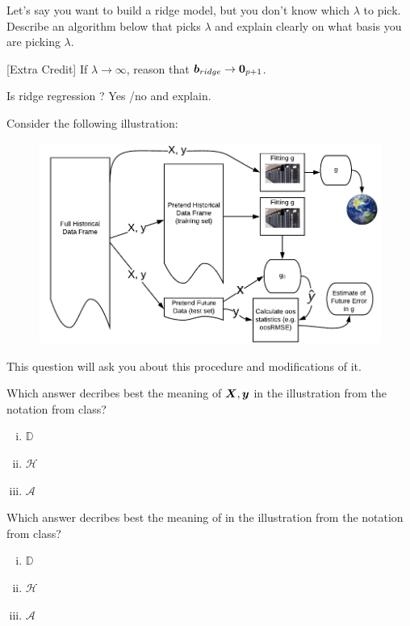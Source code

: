\documentclass[12pt]{article}
\begin{document}
 Let's say you want to build a ridge model, but you don't know which $\lambda$ to pick. Describe an algorithm below that picks $\lambda$ and explain clearly on what basis you are picking $\lambda$. 

 [Extra Credit] If $\lambda \rightarrow \infty$, reason that $\boldsymbol{b}_{ridge} \rightarrow \boldsymbol{0}_{p+1}$. 


 Is ridge regression ? Yes /no and explain. 
\eenum


\problem Consider the following illustration:

\begin{figure}[htp]
\centering\includegraphics[width=7in]{oos_validation}
\end{figure}

\noindent This question will ask you about this procedure and modifications of it.


\benum

 Which answer decribes best the meaning of $\boldsymbol{X}, \boldsymbol{y}$ in the illustration from the notation from class?

\begin{enumerate}[i)]
\item $\mathbb{D}$
\item $\mathcal{H}$
\item $\mathcal{A}$
\end{enumerate}

 Which answer decribes best the meaning of  in the illustration from the notation from class?

\begin{enumerate}[i)]
\item $\mathbb{D}$
\item $\mathcal{H}$
\item $\mathcal{A}$
\end{enumerate}
\end{document}
